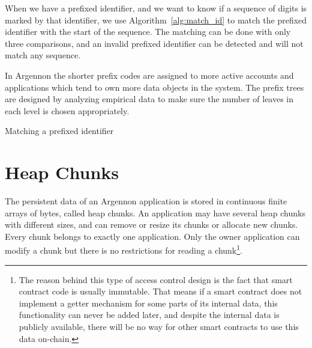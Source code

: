 When we have a prefixed identifier, and we want to know if a sequence of digits is marked by that identifier,
we use Algorithm~\ref{alg:match_id} to match the prefixed identifier with the start of the sequence. The matching
can be done with only three comparisons, and an invalid prefixed identifier can be detected and will not match
any sequence.

In Argennon the shorter prefix codes are assigned to more active accounts and applications which tend to own more
data objects in the system. The prefix trees are designed by analyzing empirical data to make sure the number
of leaves in each level is chosen appropriately.

\begin{algorithm}[h]
    \DontPrintSemicolon
    \BlankLine
    \BlankLine
    {
        {
            \;
        }
    }
    \;
    \caption{Matching a prefixed identifier}\label{alg:match_id}
\end{algorithm}


\section{Heap Chunks}\label{heap}

The persistent data of an Argennon application is stored in continuous finite
arrays of bytes, called heap chunks. An application may have several heap chunks
with different sizes, and can remove or
resize its chunks or allocate new chunks. Every chunk belongs to exactly one application. Only the owner application can
modify a chunk but there is no restrictions for reading a chunk\footnote{The reason behind this type of access
control design is the fact that smart contract
code is usually immutable. That means if a smart contract does not implement a
getter mechanism for some parts of its internal data, this functionality can never
be added later, and despite the internal data is publicly available, there will be no
way for other smart contracts to use this data on-chain.}.

